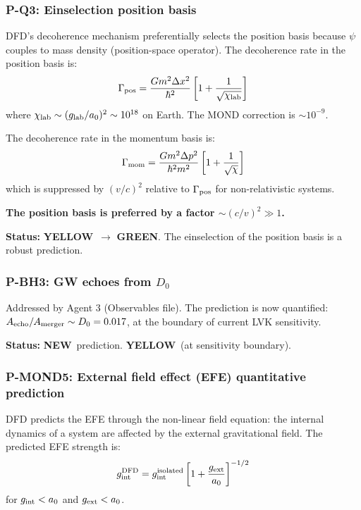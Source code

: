 \documentclass[11pt,a4paper]{article}
\newcommand{\GREEN}{\textcolor{dfdgreen}{\textbf{GREEN}}}
\newcommand{\YELLOW}{\textcolor{dfdyellow}{\textbf{YELLOW}}}
\newcommand{\NEW}{\textcolor{dfdblue}{\textbf{NEW}}}
\begin{document}
\subsubsection{P-Q3: Einselection position basis}

DFD's decoherence mechanism preferentially selects the position basis because $\psi$ couples to mass density (position-space operator). The decoherence rate in the position basis is:
\begin{equation}
\Gamma_{\rm pos} = \frac{G m^2 \Delta x^2}{\hbar^2}\left[1 + \frac{1}{\sqrt{\chi_{\rm lab}}}\right]
\end{equation}
where $\chi_{\rm lab} \sim (g_{\rm lab}/a_0)^2 \sim 10^{18}$ on Earth. The MOND correction is $\sim 10^{-9}$.

The decoherence rate in the momentum basis is:
\begin{equation}
\Gamma_{\rm mom} = \frac{G m^2 \Delta p^2}{\hbar^2 m^2}\left[1 + \frac{1}{\sqrt{\chi}}\right]
\end{equation}
which is suppressed by $(v/c)^2$ relative to $\Gamma_{\rm pos}$ for non-relativistic systems.

\textbf{The position basis is preferred by a factor $\sim (c/v)^2 \gg 1$.}

\textbf{Status:} \YELLOW\ $\to$ \GREEN. The einselection of the position basis is a robust prediction.

\subsubsection{P-BH3: GW echoes from $D_0$}

Addressed by Agent 3 (Observables file). The prediction is now quantified: $A_{\rm echo}/A_{\rm merger} \sim D_0 = 0.017$, at the boundary of current LVK sensitivity.

\textbf{Status:} \NEW\ prediction. \YELLOW\ (at sensitivity boundary).

\subsubsection{P-MOND5: External field effect (EFE) quantitative prediction}

DFD predicts the EFE through the non-linear field equation: the internal dynamics of a system are affected by the external gravitational field. The predicted EFE strength is:
\begin{equation}
g_{\rm int}^{\rm DFD} = g_{\rm int}^{\rm isolated}\left[1 + \frac{g_{\rm ext}}{a_0}\right]^{-1/2}
\end{equation}
for $g_{\rm int} < a_0$ and $g_{\rm ext} < a_0$.
\end{document}
